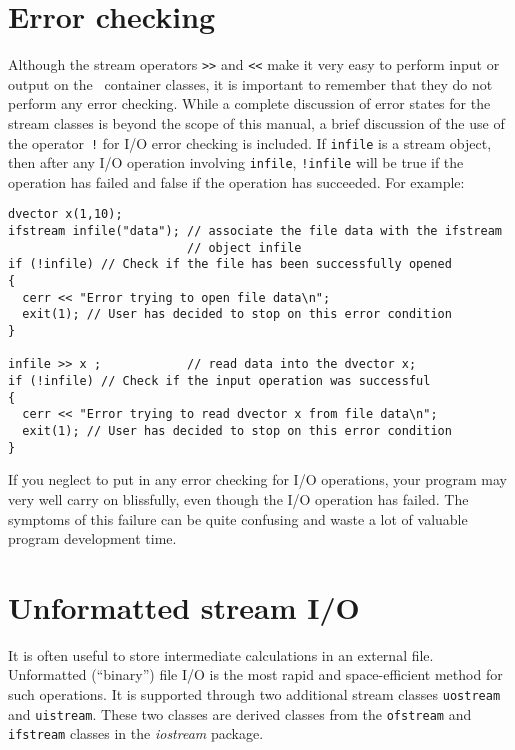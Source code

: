 \documentclass{admbmanual}
\begin{document}
\section{Error checking}

Although the stream operators \texttt{>{}>} and \texttt{<{}<} make it very easy
to perform input or output on the \scAD\ container classes, it is important to
remember that they do not perform any error checking. While a complete
discussion of error states for the stream classes is beyond the scope of this
manual, a brief discussion of the use of the operator~\texttt{!} for I/O error
checking is included. If \texttt{infile} is a stream object, then after any I/O
operation involving \texttt{infile}, \texttt{!infile} will be true if the
operation has failed and false if the operation has succeeded. For example:
\begin{lstlisting}
dvector x(1,10);
ifstream infile("data"); // associate the file data with the ifstream
                         // object infile
if (!infile) // Check if the file has been successfully opened
{
  cerr << "Error trying to open file data\n";
  exit(1); // User has decided to stop on this error condition
}

infile >> x ;            // read data into the dvector x;
if (!infile) // Check if the input operation was successful
{
  cerr << "Error trying to read dvector x from file data\n";
  exit(1); // User has decided to stop on this error condition
}
\end{lstlisting}

If you neglect to put in any error checking for I/O operations, your program may
very well carry on blissfully, even though the I/O operation has failed. The
symptoms of this failure can be quite confusing and waste a lot of valuable
program development time.

\section{Unformatted stream I/O}

It is often useful to store intermediate calculations in an external file.
Unformatted (``binary'') file I/O is the most rapid and space-efficient method
for such operations. It is supported through two additional stream classes
\texttt{uostream} and \texttt{uistream}. These two classes are derived classes
from the \texttt{ofstream} and \texttt{ifstream} classes in the
\textit{iostream} package.
\end{document}
